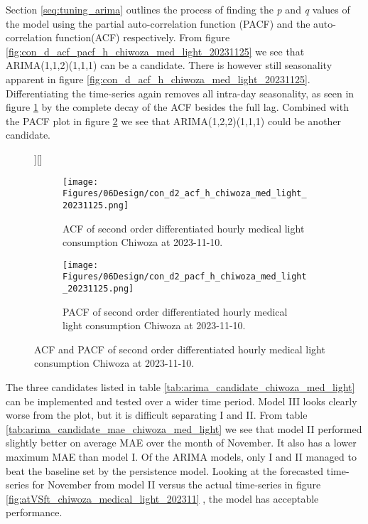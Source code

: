 Section \ref{seq:tuning_arima} outlines the process of finding the \textit{p} and \textit{q} values of the model using the partial auto-correlation function (PACF) and the auto-correlation function(ACF) respectively. From figure \ref{fig:con_d_acf_pacf_h_chiwoza_med_light_20231125} we see that ARIMA(1,1,2)(1,1,1) can be a candidate. There is however still seasonality apparent in figure \ref{fig:con_d_acf_h_chiwoza_med_light_20231125}. Differentiating the time-series again removes all intra-day seasonality, as seen in figure \ref{fig:con_d2_acf_h_chiwoza_med_light_20231125} by the complete decay of the ACF besides the full lag. Combined with the PACF plot in figure \ref{fig:con_d2_pacf_h_chiwoza_med_light_20231125} we see that ARIMA(1,2,2)(1,1,1) could be another candidate. \\

\begin{figure}][]
  \centering

  \begin{subfigure}{\textwidth}
    \centering
    \texttt{[image: Figures/06Design/con\_d2\_acf\_h\_chiwoza\_med\_light\_20231125.png]}
    \caption[ACF second order differentiated medical consumption 20231110]{ACF of second order differentiated hourly medical light consumption Chiwoza at 2023-11-10.}
    \label{fig:con_d2_acf_h_chiwoza_med_light_20231125}
  \end{subfigure}

  \vspace{0.5cm}

  \begin{subfigure}{\textwidth}
    \centering
    \texttt{[image: Figures/06Design/con\_d2\_pacf\_h\_chiwoza\_med\_light\_20231125.png]}
    \caption[PACF second order differentiated medical consumption 20231110]{PACF of second order differentiated  hourly medical light consumption Chiwoza at 2023-11-10.}
    \label{fig:con_d2_pacf_h_chiwoza_med_light_20231125}
  \end{subfigure}

  \caption[ACF and PACF second order differentiated medical consumption 20231110]{ACF and PACF of second order differentiated hourly medical light consumption Chiwoza at 2023-11-10.}
  \label{fig:con_d2_acf_pacf_h_chiwoza_med_light_20231125}
\end{figure}

The three candidates listed in table \ref{tab:arima_candidate_chiwoza_med_light} can be implemented and tested over a wider time period. Model III looks clearly worse from the plot, but it is difficult separating I and II. From table \ref{tab:arima_candidate_mae_chiwoza_med_light} we see that model II performed slightly better on average MAE over the month of November. It also has a lower maximum MAE than model I. Of the ARIMA models, only I and II managed to beat the baseline set by the persistence model. Looking at the forecasted time-series for November from model II versus the actual time-series in figure \ref{fig:atVSft_chiwoza_medical_light_202311} , the model has acceptable performance. 

